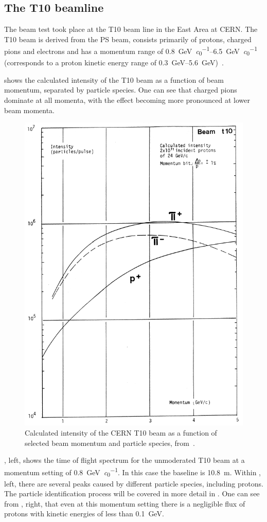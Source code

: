 \subsection{The T10 beamline}
\label{sec:hptpc_beam_flux:overview:t10}

The beam test took place at the T10 beam line in the East Area at CERN.
The T10 beam is derived from the PS beam, consists primarily of protons, charged pions and electrons and has a momentum range of \SIrange{0.8}{6.5}{\giga\electronvolt\per\clight} (corresponds to a proton kinetic energy range of \SIrange{0.3}{5.6}{\giga\electronvolt})~\cite{t10Report}.

 shows the calculated intensity of the T10 beam as a function of beam momentum, separated by particle species.
One can see that charged pions dominate at all momenta, with the effect becoming more pronounced at lower beam momenta.

\begin{figure}[h]
  \centering
  \includegraphics[width=.6\linewidth]{files/figures/hptpc_beam_flux/t10Comp}
  \caption[Calculated intensity of the CERN T10 beam as a function of selected beam momentum and particle species.]{Calculated intensity of the CERN T10 beam as a function of selected beam momentum and particle species, from~\cite{t10Report}.}
  \label{fig:t10Calc}
\end{figure}

, left, shows the time of flight spectrum for the unmoderated T10 beam at a momentum setting of \SI{0.8}{\giga\electronvolt\per\clight}.
In this case the baseline is \SI{10.8}{\metre}.
Within , left, there are several peaks caused by different particle species, including protons.
The particle identification process will be covered in more detail in .
One can see from , right, that even at this momentum setting there is a negligible flux of protons with kinetic energies of less than \SI{0.1}{\giga\electronvolt}.


